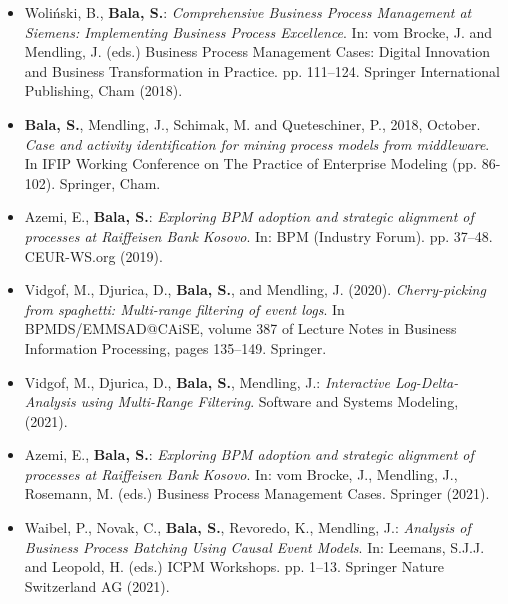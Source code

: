 \begin{itemize}
	\item Woli\'nski, B., \textbf{Bala, S.}: \textit{Comprehensive Business Process Management at Siemens: Implementing Business Process Excellence}. In: vom Brocke, J. and Mendling, J. (eds.) Business Process Management Cases: Digital Innovation and Business Transformation in Practice. pp. 111--124. Springer International Publishing, Cham (2018). \cite[]{Wolinski2018}
	
	\item \textbf{Bala, S.}, Mendling, J., Schimak, M. and Queteschiner, P., 2018, October. \textit{Case and activity identification for mining process models from middleware}. In IFIP Working Conference on The Practice of Enterprise Modeling (pp. 86-102). Springer, Cham. \citep{DBLP:conf/ifip8-1/BalaMSQ18}
	
	\item Azemi, E., \textbf{Bala, S.}: \textit{Exploring BPM adoption and strategic alignment of processes at Raiffeisen Bank Kosovo}. In: BPM (Industry Forum). pp. 37–48. CEUR-WS.org (2019). \cite[]{DBLP:conf/bpm/AzemiB19}
	
	\item Vidgof, M., Djurica, D., \textbf{Bala, S.}, and Mendling, J. (2020). \textit{Cherry-picking from
	spaghetti: Multi-range filtering of event logs}. In BPMDS/EMMSAD@CAiSE,
	volume 387 of Lecture Notes in Business Information Processing, pages 135–149.
	Springer. \citep{DBLP:conf/caise/VidgofDBM20}
	
	\item Vidgof, M., Djurica, D., \textbf{Bala, S.}, Mendling, J.: \textit{Interactive Log-Delta-Analysis using Multi-Range Filtering}. Software and Systems Modeling, (2021). \citep{Vidgof2021}
	
	\item Azemi, E., \textbf{Bala, S.}: \textit{Exploring BPM adoption and strategic alignment of processes at Raiffeisen Bank Kosovo}. In: vom Brocke, J., Mendling, J., Rosemann, M. (eds.) Business Process Management Cases. Springer (2021). \citep{Azemi2021}
	
	\item Waibel, P., Novak, C., \textbf{Bala, S.}, Revoredo, K., Mendling, J.: \textit{Analysis of Business Process Batching Using Causal Event Models}. In: Leemans, S.J.J. and Leopold, H. (eds.) ICPM Workshops. pp. 1–13. Springer Nature Switzerland AG (2021). \citep{Waibel2021}
	
\end{itemize}

